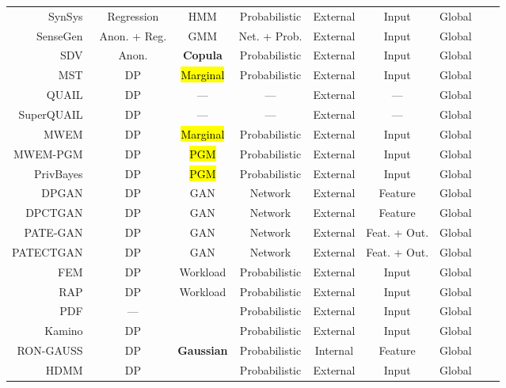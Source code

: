 \documentclass[parskip=full]{scrartcl}
\begin{document}
\begin{longtable}{rcccccccc}
    \bottomrule
    \endlastfoot
    SynSys~\cite{dahmen2019synsys} & Regression & HMM & Probabilistic & External & Input & Global \\
    SenseGen~\cite{alzantot2017sensegen} & Anon. + Reg. & GMM & Net. + Prob. & External & Input & Global \\
    SDV~\cite{patki2016synthetic} & Anon. & \textbf{Copula} & Probabilistic & External & Input & Global \\
    MST~\cite{mckenna2021winning} & DP & \hl{Marginal} & Probabilistic & External & Input & Global \\
    QUAIL~\cite{rosenblatt2020differentially} & DP & --- & --- & External & --- & Global \\
    SuperQUAIL~\cite{rosenblatt2022spending} & DP & --- & --- & External & --- & Global \\
    MWEM~\cite{hardt2012simple} & DP & \hl{Marginal} & Probabilistic & External & Input & Global \\
    MWEM-PGM~\cite{mckenna2019graphical} & DP & \hl{PGM} & Probabilistic & External & Input & Global \\
    PrivBayes~\cite{zhang2017privbayes} & DP & \hl{PGM} & Probabilistic & External & Input & Global \\
    DPGAN~\cite{xie2018differentially} & DP & GAN & Network & External & Feature & Global \\
    DPCTGAN~\cite{rosenblatt2020differentially} & DP & GAN &  Network & External & Feature & Global \\
    PATE-GAN~\cite{jordon2018pate} & DP & GAN & Network & External & Feat. + Out. & Global \\
    PATECTGAN~\cite{rosenblatt2020differentially} & DP & GAN & Network & External & Feat. + Out. & Global \\
    FEM~\cite{vietri2020new} & DP & Workload & Probabilistic & External & Input & Global \\
    RAP~\cite{aydore2021differentially} & DP & Workload & Probabilistic & External & Input & Global \\
    PDF~\cite{de2019formal, suciu2011probabilistic} & --- &  & Probabilistic & External & Input & Global \\
    Kamino~\cite{ge2021kamino} & DP  &  & Probabilistic & External & Input & Global \\
    RON-GAUSS~\cite{chanyaswad2019ron} & DP & \textbf{Gaussian} & Probabilistic & Internal & Feature & Global \\
    HDMM~\cite{mckenna2018optimizing} & DP &  & Probabilistic & External & Input & Global \\

\end{longtable}
\end{document}
